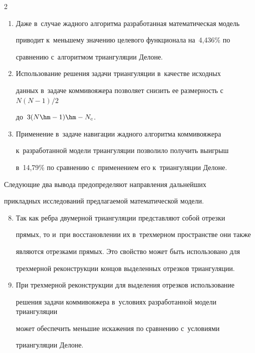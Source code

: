 \begin{multicols}{2}
\begin{enumerate}[1.]
расширенных классов алгоритмов оптимизации.


\item Даже в~случае жадного алгоритма разработанная математическая модель 


приводит к~меньшему значению целевого функционала на~4,436\% по 


сравнению с~алгоритмом триангуляции Делоне.


\item Использование решения задачи триангуляции в~качестве исходных 


данных в~задаче коммивояжера позволяет снизить ее размерность с~$N(N-1)/2$ 


до~$3(N\hm-1)\hm- N_c$.


  \item Применение в~задаче навигации жадного алгоритма коммивояжера 


к~разработанной модели триангуляции поз\-во\-ли\-ло получить выигрыш 


в~14,79\% по сравнению с~применением его к~триангуляции Делоне.


  \end{enumerate}


  


  Следующие два вывода предопределяют на\-прав\-ле\-ния дальнейших 


при\-клад\-ных исследований предлагаемой математической модели.


  \begin{enumerate}[1.]


  \setcounter{enumi}{7}


  \item Так как реб\-ра двумерной триангуляции пред\-став\-ля\-ют собой отрезки 


прямых, то и~при восстановлении их в~трехмерном пространстве они также 


являются отрезками прямых. Это свойство может быть использовано для 


трехмерной реконструкции концов выделенных отрезков триангуляции.


  \item При трехмерной реконструкции для выделения отрезков использование 


решения задачи коммивояжера в~условиях разработанной модели триангуляции 


может обеспечить меньшие искажения по срав\-не\-нию с~условиями 


триангуляции Делоне.



\end{enumerate}
\end{multicols}
